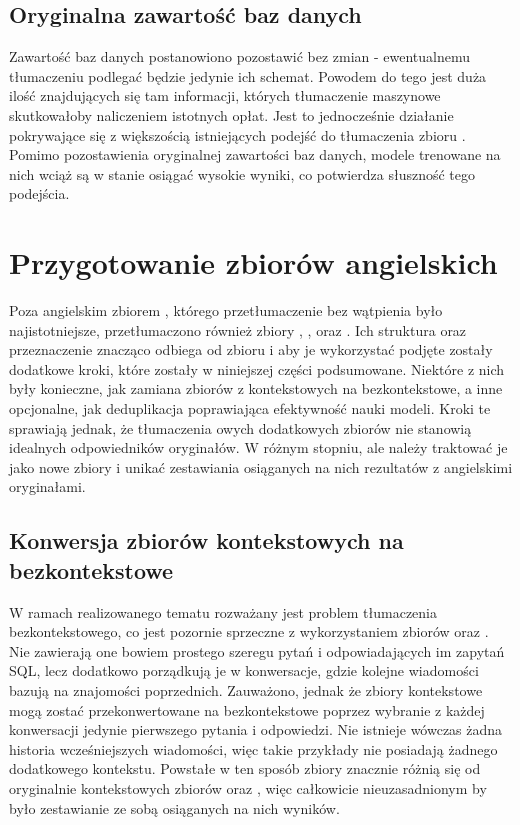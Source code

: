 \subsection{Oryginalna zawartość baz danych}
Zawartość baz danych postanowiono pozostawić bez zmian - ewentualnemu tłumaczeniu podlegać będzie jedynie ich schemat. Powodem do tego jest duża ilość znajdujących się tam informacji, których tłumaczenie maszynowe skutkowałoby naliczeniem istotnych opłat. Jest to jednocześnie działanie pokrywające się z większością istniejących podejść do tłumaczenia zbioru . Pomimo pozostawienia oryginalnej zawartości baz danych, modele trenowane na nich wciąż są w stanie osiągać wysokie wyniki, co potwierdza słuszność tego podejścia.

\section{Przygotowanie zbiorów angielskich}
Poza angielskim zbiorem , którego przetłumaczenie bez wątpienia było najistotniejsze, przetłumaczono również zbiory , ,  oraz . Ich struktura oraz przeznaczenie znacząco odbiega od zbioru  i aby je wykorzystać podjęte zostały dodatkowe kroki, które zostały w niniejszej części podsumowane. Niektóre z nich były konieczne, jak zamiana zbiorów z kontekstowych na bezkontekstowe, a inne opcjonalne, jak deduplikacja poprawiająca efektywność nauki modeli. Kroki te sprawiają jednak, że tłumaczenia owych dodatkowych zbiorów nie stanowią idealnych odpowiedników oryginałów. W różnym stopniu, ale należy traktować je jako nowe zbiory i unikać zestawiania osiąganych na nich rezultatów z angielskimi oryginałami.

\subsection{Konwersja zbiorów kontekstowych na bezkontekstowe}
W ramach realizowanego tematu rozważany jest problem tłumaczenia bezkontekstowego, co jest pozornie sprzeczne z wykorzystaniem zbiorów  oraz . Nie zawierają one bowiem prostego szeregu pytań i odpowiadających im zapytań SQL, lecz dodatkowo porządkują je w konwersacje, gdzie kolejne wiadomości bazują na znajomości poprzednich. Zauważono, jednak że zbiory kontekstowe mogą zostać przekonwertowane na bezkontekstowe poprzez wybranie z każdej konwersacji jedynie pierwszego pytania i odpowiedzi. Nie istnieje wówczas żadna historia wcześniejszych wiadomości, więc takie przykłady nie posiadają żadnego dodatkowego kontekstu. Powstałe w ten sposób zbiory znacznie różnią się od oryginalnie kontekstowych zbiorów  oraz , więc całkowicie nieuzasadnionym by było zestawianie ze sobą osiąganych na nich wyników.

